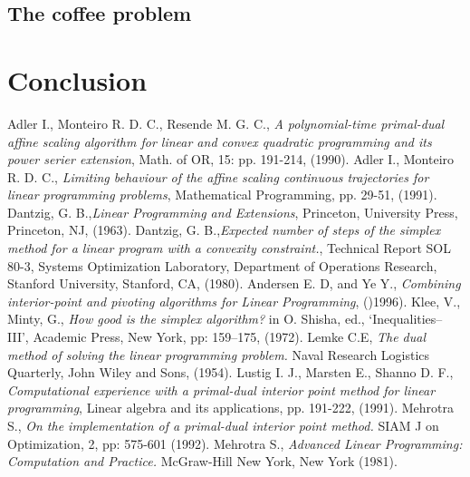 \documentclass[a4paper,10 pt,titlepage,twoside]{book}
\theoremstyle{plain}
\theoremstyle{definition}
\theoremstyle{remark}
\begin{document}
\section{The coffee problem}
\chapter{Conclusion}

\begin{thebibliography}{9}
	 Adler I., Monteiro R. D. C., Resende M. G. C., \emph{A polynomial-time primal-dual affine scaling algorithm for linear and convex quadratic programming and its power serier extension}, Math. of OR, 15: pp. 191-214, (1990).
	 Adler I., Monteiro R. D. C., \emph{Limiting behaviour of the affine scaling continuous trajectories for linear programming problems}, Mathematical Programming, pp. 29-51, (1991).
	Dantzig, G. B.,\emph{\;Linear Programming and Extensions}, Princeton, University Press, Princeton, NJ, (1963).
	Dantzig, G. B.,\emph{\;Expected number of steps of the simplex method for a linear program with a convexity constraint.}, Technical Report SOL 80-3, Systems Optimization Laboratory, Department of Operations Research, Stanford University, Stanford, CA, (1980).
	 Andersen E. D, and Ye Y.,  \textit{Combining interior-point and pivoting algorithms for Linear Programming}, ()1996).
		 Klee, V., Minty, G., \emph{ How good is the simplex algorithm? } in O. Shisha, ed.,
	‘Inequalities–III’, Academic Press, New York, pp: 159–175, (1972).
	 Lemke C.E, \textit{ The dual method of solving the linear programming problem.} Naval Research Logistics Quarterly, John Wiley and Sons, (1954).
		 Lustig I. J., Marsten E., Shanno D. F., \emph{ Computational experience with a primal-dual interior point method for linear programming}, Linear algebra and its applications, pp. 191-222, (1991).
	 Mehrotra S., \emph{ On the implementation of a primal-dual interior point method. } SIAM J on Optimization, 2, pp: 575-601 (1992).
	 Mehrotra S., \emph{ Advanced Linear Programming: Computation and
	Practice. } McGraw-Hill New York, New York (1981).


\end{thebibliography}
\end{document}
